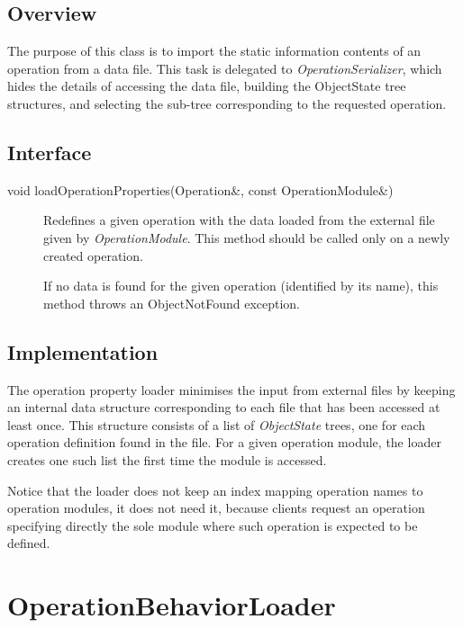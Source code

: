 \documentclass[a4paper,twoside]{tce}
\begin{document}
\subsection{Overview}

The purpose of this class is to import the static information contents of an
operation from a data file.  This task is delegated to
\emph{OperationSerializer}, which hides the details of accessing the data
file, building the ObjectState tree structures, and selecting the sub-tree
corresponding to the requested operation.

\subsection{Interface}

\begin{description}
\item[void loadOperationProperties(Operation\&, const OperationModule\&)]%
  Redefines a given operation with the data loaded from the external file
  given by \emph{OperationModule}. This method should be called only on a
  newly created operation.

  If no data is found for the given operation (identified by its name), this
  method throws an ObjectNotFound exception.

\end{description}

\subsection{Implementation}

The operation property loader minimises the input from external files by
keeping an internal data structure corresponding to each file that has been
accessed at least once.  This structure consists of a list of
\emph{ObjectState} trees, one for each operation definition found in the
file.  For a given operation module, the loader creates one such list the
first time the module is accessed.

Notice that the loader does not keep an index mapping operation names to
operation modules, it does not need it, because clients request an operation
specifying directly the sole module where such operation is expected to be
defined.


\section{OperationBehaviorLoader}
\label{sec:opBehaviorLoader}
\end{document}
